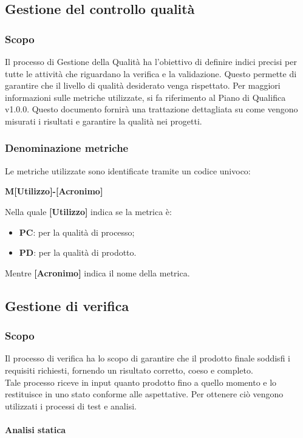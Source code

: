 \subsection{Gestione del controllo qualità}
\subsubsection{Scopo}
Il processo di Gestione della Qualità ha l'obiettivo di definire indici
precisi per tutte le attività che riguardano la verifica e la validazione.
Questo permette di garantire che il livello di qualità desiderato venga
rispettato. Per maggiori informazioni sulle metriche utilizzate,
si fa riferimento al Piano di Qualifica v1.0.0.
Questo documento fornirà una trattazione dettagliata su come
vengono misurati i risultati e garantire la qualità nei progetti.
\subsubsection{Denominazione metriche}
Le metriche utilizzate sono identificate tramite un codice univoco:
\begin{center}
    \textbf{M[Utilizzo]-[Acronimo]}
\end{center}
Nella quale \textbf{[Utilizzo]} indica se la metrica è:
\begin{itemize}
    \item \textbf{PC}: per la qualità di processo;
    \item \textbf{PD}:  per la qualità di prodotto.
\end{itemize}
Mentre \textbf{[Acronimo]} indica il nome della metrica.
\subsection{Gestione di verifica}
\subsubsection{Scopo} 
Il processo di verifica ha lo scopo di garantire che il prodotto finale soddisfi i requisiti richiesti, fornendo un risultato corretto, coeso e completo.\\
Tale processo riceve in input quanto prodotto fino a quello momento e lo restituisce in uno stato conforme alle aspettative.
Per ottenere ciò vengono utilizzati i processi di test e analisi.
\paragraph{Analisi statica} ~

